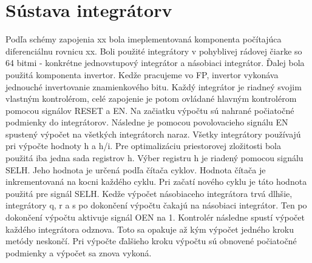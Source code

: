 \section{Sústava integrátorv} \label{impl_rovnice}
Podľa schémy zapojenia xx bola imeplementovaná komponenta počítajúca diferenciálnu rovnicu xx. Boli použité integrátory v pohyblivej rádovej čiarke so 64 bitmi - konkrétne jednovstupový integrátor a násobiaci integrátor. Ďalej bola použitá komponenta invertor. Kedže pracujeme vo FP, invertor vykonáva jednouché invertovanie znamienkového bitu. 
Každý integrátor je riadneý svojim vlastným kontrolérom, celé zapojenie je potom ovládané hlavným kontrolérom pomocou signálov RESET a EN. Na začiatku výpočtu sú nahrané počiatočné podmienky do integrátorov. Následne je pomocou povolovacieho signálu EN spustený výpočet na všetkých integrátorch naraz. Všetky integrátory používajú pri výpočte hodnoty h a h/i. Pre optimalizáciu priestorovej zložitosti bola použitá iba jedna sada registrov h. Výber registru h je riadený pomocou signálu SELH. Jeho hodnota je určená podľa čítača cyklov. Hodnota čítača je inkrementovaná na kocni každého cyklu. Pri začatí nového cyklu je táto hodnota použitá pre signál SELH.
Kedže výpočet násobiaceho integrátora trvá dlhšie, integrátory q, r a s po dokončení výpočtu čakajú na násobiaci integrátor. Ten po dokončení výpočtu aktivuje signál OEN na 1. Kontrolér následne spustí výpočet každého integrátora odznova. Toto sa opakuje až kým výpočet jedného kroku metódy neskončí. Pri výpočte ďalšieho kroku výpočtu sú obnovené počiatočné podmienky a výpočet sa znova vykoná.

